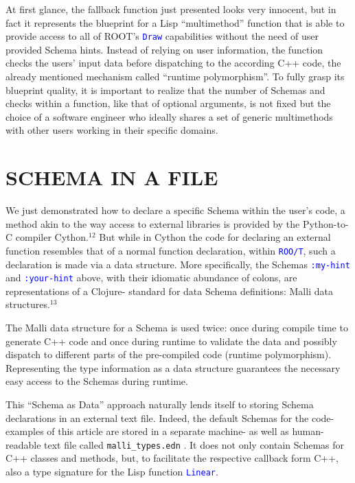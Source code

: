 \documentclass{IEEEcsmag}
\begin{document}
At first glance, the fallback function just presented looks very innocent, but in fact it represents the blueprint for a Lisp “multimethod” function that is able to provide access to all of ROOT’s \texttt{\textcolor{blue}{Draw}} capabilities without the need of user provided Schema hints. Instead of relying on user information, the function checks the users’ input data before dispatching to the according C++ code, the already mentioned mechanism called “runtime polymorphism”. To fully grasp its blueprint quality, it is important to realize that the number of Schemas and checks within a function, like that of optional arguments, is not fixed but the choice of a software engineer who ideally shares a set of generic multimethods with other users working in their specific domains.\vspace*{-5pt}

\section{SCHEMA IN A FILE}
We just demonstrated how to declare a specific Schema within the user’s code, a method akin to the way access to external libraries is provided by the Python-to-C compiler Cython.$^{12}$ But while in Cython the code for declaring an external function resembles that of a normal function declaration, within \texttt{\textcolor{blue}{ROO/T}}, such a declaration is made via a data structure. More specifically, the Schemas \texttt{\textcolor{blue}{:my-hint}} and \texttt{\textcolor{blue}{:your-hint}} above, with their idiomatic abundance of colons, are representations of a Clojure- standard for data Schema definitions: Malli data structures.$^{13}$

The Malli data structure for a Schema is used twice: once during compile time to generate C++ code and once during runtime to validate the data and possibly dispatch to different parts of the pre-compiled code (runtime polymorphism). Representing the type information as a data structure guarantees the necessary easy access to the Schemas during runtime.

This “Schema as Data” approach naturally lends itself to storing Schema declarations in an external text file. Indeed, the default Schemas for the code-examples of this article are stored in a separate machine- as well as human-readable text file called \texttt{malli\_types.edn} . It does not only contain Schemas for C++ classes and methods, but, to facilitate the respective callback form C++, also a type signature for the Lisp function \texttt{\textcolor{blue}{Linear}}.\vspace*{-5pt}
\end{document}
